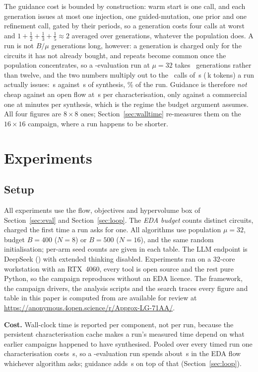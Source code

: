 \documentclass[acmsmall,review,anonymous]{acmart}
\begin{document}
The guidance cost is bounded by construction: warm start is one call, and each
generation issues at most one injection, one guided-mutation, one prior and one
refinement call, gated by their periods, so a generation costs four calls at
worst and $1+\tfrac{1}{2}+\tfrac{1}{3}+\tfrac{1}{5}\approx2$ averaged over
generations, whatever the population does.  A run is not $B/\mu$ generations long, however: a generation
is charged only for the circuits it has not already bought, and repeats become
common once the population concentrates, so a \Budget-evaluation run at
$\mu=32$ takes \GensEight\ generations rather than twelve, and the two numbers
multiply out to the \LLMcalls\ calls of \LLMsec\,s (\LLMtok\,k tokens) a run
actually issues: \TimeGuidance\,s against \TimeEDAcold\,s of synthesis,
\GuidanceShare\% of the run.  Guidance is therefore \emph{not} cheap against an
open flow at \SecPerCircuit\,s per characterisation, only against a commercial
one at minutes per synthesis, which is the regime the budget argument assumes.
All four figures are $8\times8$ ones; Section~\ref{sec:walltime} re-measures
them on the $16\times16$ campaign, where a run happens to be shorter.

\section{Experiments}
\label{sec:exp}
\subsection{Setup}
\label{sec:setup}
All experiments use the flow, objectives and hypervolume box of
Section~\ref{sec:eval} and Section~\ref{sec:loop}.  The \emph{EDA budget} counts
distinct circuits, charged the first time a run asks for one.  All algorithms
use population $\mu=32$, budget $B=400$ ($N=8$) or $B=500$ ($N=16$), and the
same random initialisation; per-arm seed counts are given in each table.  The
LLM endpoint is DeepSeek (\texttt{\LLMname}) with extended thinking disabled.
Experiments ran on a 32-core workstation with an RTX~4060, every tool is open
source and the rest pure Python, so the campaign reproduces without an EDA
licence.  The framework, the campaign drivers, the analysis scripts and the
search traces every figure and table in this paper is computed from are
available for review at
\url{https://anonymous.4open.science/r/Approx-LG-71AA/}.

\textbf{Cost.}  Wall-clock time is reported per component, not per run, because
the persistent characterisation cache makes a run's measured time depend on
what earlier campaigns happened to have synthesised.  Pooled over every timed
run one characterisation costs \SecPerCircuit\,s, so a \Budget-evaluation run
spends about \TimeEDAcold\,s in the EDA flow whichever algorithm asks; guidance
adds \TimeGuidance\,s on top of that (Section~\ref{sec:loop}).
\end{document}
